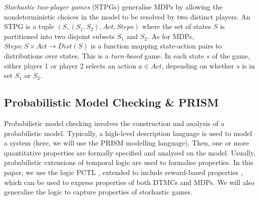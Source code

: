 \documentclass{llncs}
\begin{document}
\emph{Stochastic two-player games} (STPGs) generalise MDPs by allowing the nondeterministic choices
in the model to be resolved by two distinct players.
An STPG is a tuple $(S,(S_1,S_2),Act,Steps)$
where the set of states $S$ is partitioned into two disjoint subsets $S_1$ and $S_2$.
As for MDPs, $Steps:S\times Act\rightarrow Dist(S)$ is a function mapping
state-action pairs to distributions over states.
This is a \emph{turn-based} game. In each state $s$ of the game,
either player 1 or player 2 selects an action $a\in Act$,
depending on whether $s$ is in set $S_1$ or $S_2$.


\subsection{Probabilistic Model Checking \& PRISM}

Probabilistic model checking involves the construction and analysis of a probabilistic model.
Typically, a high-level description language is used to model a system
(here, we will use the PRISM \cite{KNP11} modelling language).
Then, one or more quantitative properties are formally specified and analysed on the model.
Usually, probabilistic extensions of temporal logic are used to formalise properties.
In this paper, we use the logic PCTL \cite{HJ94},
extended to include reward-based properties \cite{KNP07a},
which can be used to express properties of both DTMCs and MDPs.
We will also generalise the logic to capture properties of stochastic games.
\end{document}

